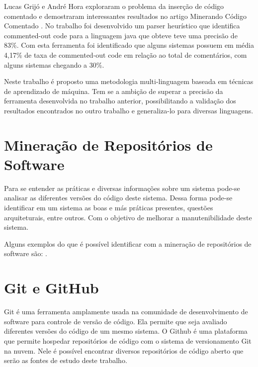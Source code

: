 \documentclass{abnt}
\begin{document}
Lucas Grijó e André Hora exploraram o problema da inserção de código comentado 
e demostraram interessantes resultados no artigo Minerando Código Comentado 
\cite{articleMiningComments}. No trabalho foi desenvolvido um parser heurístico
que identifica commented-out code para a linguagem java que obteve
teve uma precisão de 83\%. Com esta ferramenta foi identificado que alguns 
sistemas possuem em média 4,17\% de taxa de commented-out code em relação
ao total de comentários, com alguns sistemas chegando a 30\%.

Neste trabalho é proposto uma metodologia multi-linguagem baseada em técnicas de
aprendizado de máquina. Tem se a ambição de superar a precisão da ferramenta
desenvolvida no trabalho anterior, possibilitando a validação dos resultados 
encontrados no outro trabalho e generaliza-lo para diversas linguagens.


\section{Mineração de Repositórios de Software}

Para se entender as práticas e diversas informações sobre um sistema pode-se
analisar as diferentes versões do código deste sistema. Dessa forma pode-se 
identificar em um sistema as boas e más práticas presentes, questões arquiteturais,
entre outros. Com o objetivo de melhorar a manutenibilidade deste sistema. 

Alguns exemplos do que é possível identificar com a mineração de repositórios de 
software são: \cite[Predict which sections of code have the most defects and the 
steepest learning curves; Use software evolution to find the code segment that 
matters most for maintenance; Understand how multiple developers and teams 
influence code quality; etc.]{crimeScene}.

\section{Git e GitHub}

Git é uma ferramenta amplamente usada na comunidade de desenvolvimento de 
software para controle de versão de código. Ela permite que seja avaliado
diferentes versões do código de um mesmo sistema. O Github é uma plataforma
que permite hospedar repositórios de código com o sistema de versionamento
Git na nuvem. Nele é possível encontrar diversos repositórios de código aberto 
que serão as fontes de estudo deste trabalho. 
\end{document}
